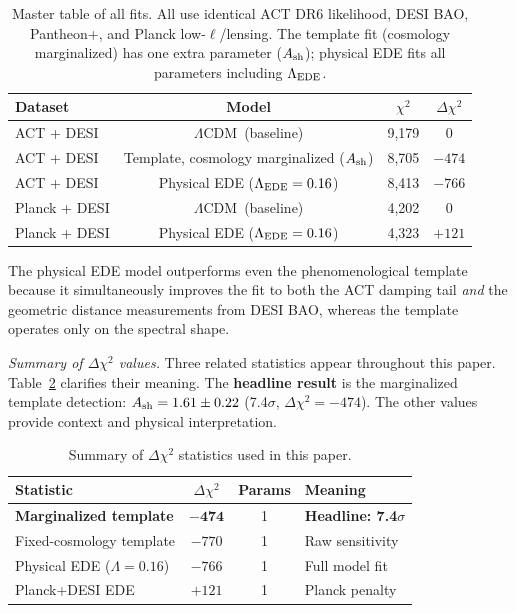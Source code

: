 \documentclass[twocolumn,showpacs,preprintnumbers,amsmath,amssymb,prd]{revtex4-2}
\newcommand{\lcdm}{$\Lambda$CDM}
\begin{document}
\begin{table}[h]
\centering
\caption{Master table of all fits. All use identical ACT DR6 likelihood, DESI BAO, 
Pantheon+, and Planck low-$\ell$/lensing. The template fit (cosmology marginalized) 
has one extra parameter ($A_{\rm sh}$); physical EDE fits all parameters including 
$\Lambda_{\rm EDE}$.}
\begin{tabular}{lccc}
\toprule
Dataset & Model & $\chi^2$ & $\Delta\chi^2$ \\
\midrule
ACT + DESI & \lcdm\ (baseline) & 9{,}179 & 0 \\
ACT + DESI & Template, cosmology marginalized ($A_{\rm sh}$) & 8{,}705 & $-474$ \\
ACT + DESI & Physical EDE ($\Lambda_{\rm EDE} = 0.16$) & 8{,}413 & $-766$ \\
Planck + DESI & \lcdm\ (baseline) & 4{,}202 & 0 \\
Planck + DESI & Physical EDE ($\Lambda_{\rm EDE} = 0.16$) & 4{,}323 & $+121$ \\
\bottomrule
\end{tabular}
\label{tab:master_fits}
\end{table}

The physical EDE model outperforms even the phenomenological template 
because it simultaneously improves the fit to both the ACT damping tail 
\emph{and} the geometric distance measurements from DESI BAO, whereas the 
template operates only on the spectral shape.

\emph{Summary of $\Delta\chi^2$ values.} Three related statistics appear throughout 
this paper. Table~\ref{tab:chi2_summary} clarifies their meaning. The \textbf{headline 
result} is the marginalized template detection: $A_{\rm sh} = 1.61 \pm 0.22$ (7.4$\sigma$, 
$\Delta\chi^2 = -474$). The other values provide context and physical interpretation.

\begin{table}[h]
\centering
\caption{Summary of $\Delta\chi^2$ statistics used in this paper.}
\begin{tabular}{lccl}
\toprule
Statistic & $\Delta\chi^2$ & Params & Meaning \\
\midrule
\textbf{Marginalized template} & $\mathbf{-474}$ & 1 & \textbf{Headline: 7.4$\sigma$} \\
Fixed-cosmology template & $-770$ & 1 & Raw sensitivity \\
Physical EDE ($\Lambda = 0.16$) & $-766$ & 1 & Full model fit \\
Planck+DESI EDE & $+121$ & 1 & Planck penalty \\
\bottomrule
\end{tabular}
\label{tab:chi2_summary}
\end{table}
\end{document}
